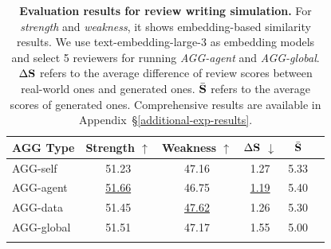 \begin{table}[t]
\centering
\small
\caption{\textbf{Evaluation results for review writing simulation.} For \textit{strength} and \textit{weakness}, it shows embedding-based similarity results. We use text-embedding-large-3 as embedding models and select 5 reviewers for running \textit{AGG-agent} and \textit{AGG-global}. $\Delta\mathbf{S}$ refers to the average difference of review scores between real-world ones and generated ones. $\bar{\mathbf{S}}$ refers to the average scores of generated ones. Comprehensive results are available in Appendix~\S\ref{additional-exp-results}.}
\begin{tabular}{lccccc}
\toprule[1pt]
\textbf{AGG Type} & \textbf{Strength} $\uparrow$ & \textbf{Weakness} $\uparrow$ & $\Delta\mathbf{S}$ $\downarrow$ & $\bar{\mathbf{S}}$ \\
\midrule
AGG-self   & 51.23          & 47.16          &  1.27 & 5.33 \\
AGG-agent  & \underline{51.66} & 46.75          &  \underline{1.19} & 5.40 \\
AGG-data   & 51.45          & \underline{47.62} &  1.26 & 5.30 \\
\midrule
AGG-global & 51.51          &  47.17          &  1.55 & 5.00\\
\bottomrule[1pt]
\vspace{-8mm}
\end{tabular}
\label{tab:review-writing-result}
\end{table}


